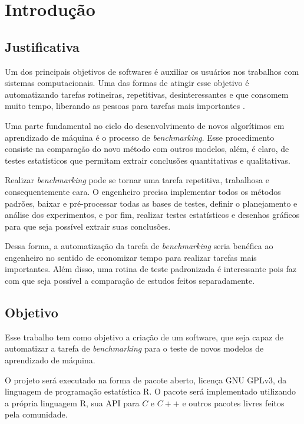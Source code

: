 
\chapter{Introdução}
\label{chap:introducao}

\section{Justificativa}
\label{sec:justificativa}
Um dos principais objetivos de softwares é auxiliar os usuários nos trabalhos com sistemas computacionais. Uma das formas de atingir esse objetivo é automatizando tarefas rotineiras, repetitivas, desinteressantes e que consomem muito tempo, liberando as pessoas para tarefas mais importantes \cite{Zambiasi2012UmaAA}. 

Uma parte fundamental no ciclo do desenvolvimento de novos algorítimos em aprendizado de máquina é o processo de \textit{benchmarking}. Esse procedimento consiste na comparação do novo método com outros modelos, além, é claro, de testes estatísticos que permitam extrair conclusões quantitativas e qualitativas.

Realizar \textit{benchmarking} pode se tornar uma tarefa repetitiva, trabalhosa e consequentemente cara. O engenheiro precisa implementar todos os métodos padrões, baixar e pré-processar todas as bases de testes, definir o planejamento e análise dos experimentos, e por fim, realizar testes estatísticos e desenhos gráficos para que seja possível extrair suas conclusões.

Dessa forma, a automatização da tarefa de \textit{benchmarking} seria benéfica ao engenheiro no sentido de economizar tempo para realizar tarefas mais importantes. Além disso, uma rotina de teste padronizada é interessante pois faz com que seja possível a comparação de estudos feitos separadamente.


\section{Objetivo}
\label{sec:objetivo}
Esse trabalho tem como objetivo a criação de um software, que seja capaz de automatizar a tarefa de \textit{benchmarking} para o teste de novos modelos de aprendizado de máquina. 

O projeto será executado na forma de pacote aberto, licença GNU GPLv3, da linguagem de programação estatística R. O pacote será implementado utilizando a própria linguagem R, sua API para $C$ e $C++$ e outros pacotes livres feitos pela comunidade.


